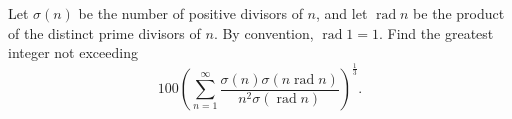 Let $\sigma(n)$ be the number of positive divisors of $n$, and let $\operatorname{rad} n$ be the product of the distinct prime divisors of $n$. By convention, $\operatorname{rad} 1 = 1$.  Find the greatest integer not exceeding \[ 100\left(\sum_{n=1}^{\infty}\frac{\sigma(n)\sigma(n \operatorname{rad} n)}{n^2\sigma(\operatorname{rad} n)}\right)^{\frac{1}{3}}. \]
